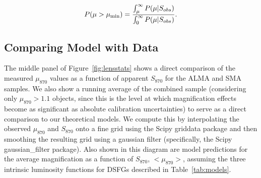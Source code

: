 \documentclass[iop]{emulateapj}
\begin{document}
\begin{equation}
    P(\mu>\mu_{\rm min}) = \frac{\int_\mu^\infty P(\mu|S_{obs})}{\int_0^\infty
    P(\mu|S_{obs})}.
\end{equation}

\subsection{Comparing Model with Data}

The middle panel of Figure~\ref{fig:lensstats} shows a direct comparison of the
measured $\mu_{870}$ values as a function of apparent $S_{870}$ for the ALMA
and SMA samples.  We also show a running average of the combined sample
(considering only $\mu_{870} > 1.1$ objects, since this is the level at which
magnification effects become as significant as absolute calibration
uncertainties) to serve as a direct comparison to our theoretical models.  We
compute this by interpolating the observed $\mu_{870}$ and $S_{870}$ onto a
fine grid using the Scipy {\sc griddata} package and then smoothing the
resulting grid using a gaussian filter (specifically, the Scipy {\sc
gaussian\_filter} package).  Also shown in this diagram are model predictions
for the average magnification as a function of $S_{870}$, $<\mu_{870}>$,
assuming the three intrinsic luminosity functions for DSFGs described in
Table~\ref{tab:models}.  
\end{document}
